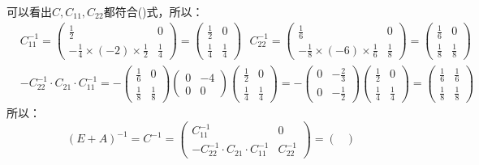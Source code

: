 \documentclass[a4paper]{report}
\begin{document}
\begin{jie}
可以看出$C,C_{11},C_{22}$都符合(\uppercase\expandafter{})式，所以：
\begin{align*}
&C_{11}^{-1}=
\begin{pmatrix}
\frac{1}{2}&0\\
-\frac{1}{4}\times(-2)\times\frac{1}{2}&\frac{1}{4}
\end{pmatrix}=\begin{pmatrix}
\frac{1}{2}&0\\
\frac{1}{4}&\frac{1}{4}
\end{pmatrix}~~~
C_{22}^{-1}=
\begin{pmatrix}
\frac{1}{6}&0\\
-\frac{1}{8}\times(-6)\times\frac{1}{6}&\frac{1}{8}
\end{pmatrix}=\begin{pmatrix}
\frac{1}{6}&0\\
\frac{1}{8}&\frac{1}{8}
\end{pmatrix}\\
& -C_{22}^{-1}\cdot C_{21}\cdot C_{11}^{-1}=
-\begin{pmatrix}
\frac{1}{6}&0\\
\frac{1}{8}&\frac{1}{8}
\end{pmatrix}\begin{pmatrix}
0&-4\\ 0&0
\end{pmatrix}\begin{pmatrix}
\frac{1}{2}&0\\
\frac{1}{4}&\frac{1}{4}
\end{pmatrix}=-
\begin{pmatrix}
0&-\frac{2}{3}\\ 0&-\frac{1}{2}
\end{pmatrix}\begin{pmatrix}
\frac{1}{2}&0\\
\frac{1}{4}&\frac{1}{4}
\end{pmatrix}=\begin{pmatrix}
\frac{1}{6}&\frac{1}{6}\\
\frac{1}{8}&\frac{1}{8}
\end{pmatrix}
\end{align*}
所以：
\begin{equation*}
  (E+A)^{-1}=C^{-1}=
  \begin{pmatrix}
   C_{11}^{-1}&0\\
   -C_{22}^{-1}\cdot C_{21}\cdot C_{11}^{-1}&C_{22}^{-1}
  \end{pmatrix}
=
\begin{pmatrix}

\end{pmatrix}
\end{equation*}
\end{jie}
\end{document}

